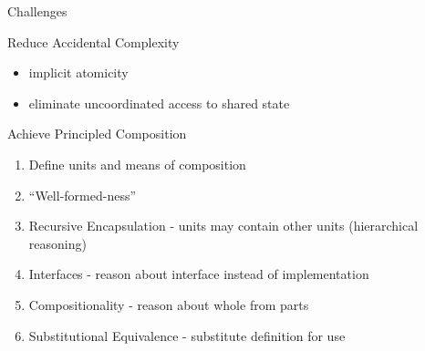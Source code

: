 \documentclass{beamer}
\begin{document}
\begin{frame}{Challenges}

  \begin{block}{Reduce Accidental Complexity}
    \begin{itemize}
    \item implicit atomicity
    \item eliminate uncoordinated access to shared state
    \end{itemize}
  \end{block}

  \begin{block}{Achieve Principled Composition}
    \begin{enumerate}
    \item Define units and means of composition
    \item ``Well-formed-ness''
    \item Recursive Encapsulation - units may contain other units (hierarchical reasoning)
    \item Interfaces - reason about interface instead of implementation
    \item Compositionality - reason about whole from parts
    \item Substitutional Equivalence - substitute definition for use
    \end{enumerate}
  \end{block}
\end{frame}







\end{document}
